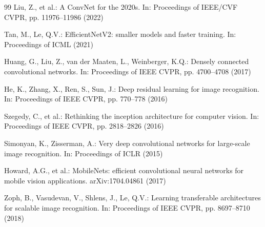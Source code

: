 \begin{thebibliography}{99}
Liu, Z., et al.: A ConvNet for the 2020s.
In: Proceedings of IEEE/CVF CVPR, pp. 11976--11986 (2022)

Tan, M., Le, Q.V.: EfficientNetV2: smaller models and faster
training. In: Proceedings of ICML (2021)

Huang, G., Liu, Z., van der Maaten, L., Weinberger, K.Q.: Densely
connected convolutional networks.
In: Proceedings of IEEE CVPR, pp. 4700--4708 (2017)

He, K., Zhang, X., Ren, S., Sun, J.: Deep residual learning for
image recognition.
In: Proceedings of IEEE CVPR, pp. 770--778 (2016)

Szegedy, C., et al.: Rethinking the inception architecture for
computer vision.
In: Proceedings of IEEE CVPR, pp. 2818--2826 (2016)

Simonyan, K., Zisserman, A.: Very deep convolutional networks for
large-scale image recognition.
In: Proceedings of ICLR (2015)

Howard, A.G., et al.: MobileNets: efficient convolutional neural
networks for mobile vision applications.
arXiv:1704.04861 (2017)

Zoph, B., Vasudevan, V., Shlens, J., Le, Q.V.: Learning
transferable architectures for scalable image recognition.
In: Proceedings of IEEE CVPR, pp. 8697--8710 (2018)

\end{thebibliography}

